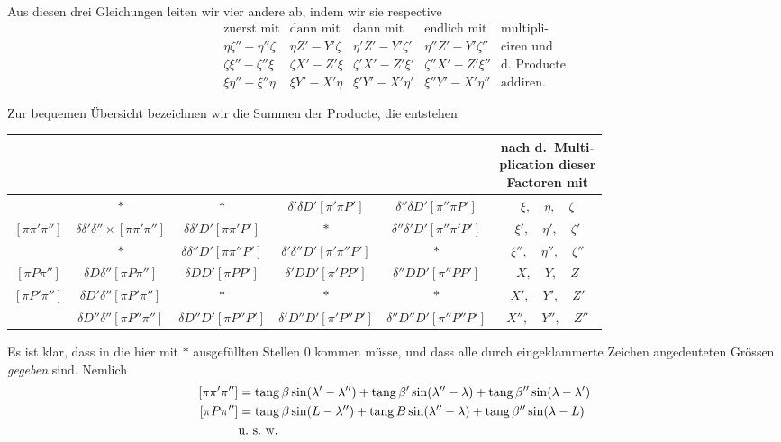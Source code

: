 Aus diesen drei Gleichungen leiten wir vier andere ab, indem wir sie respective
\[
\begin{array}{c|c|c|c|l}
\text{zuerst mit}&\text{dann mit}&\text{dann mit}&\text{endlich mit}&\text{multipli-}\\
\eta\zeta''-\eta''\zeta&\eta Z'-Y'\zeta&\eta'Z'-Y'\zeta'&\eta''Z'-Y'\zeta''&\text{ciren und}\\
\zeta\xi''-\zeta''\xi&\zeta X'-Z'\xi&\zeta'X'-Z'\xi'&\zeta''X'-Z'\xi''&\text{d.\ Producte}\\
\xi\eta''-\xi''\eta&\xi Y'-X'\eta&\xi'Y'-X'\eta'&\xi''Y'-X'\eta''&\text{addiren.}
\end{array}
\]

Zur bequemen Übersicht bezeichnen wir die Summen der Producte, die entstehen
\begin{center}\begingroup\fontsize{9}{11}\selectfont\setlength{\tabcolsep}{.8pt}
\begin{tabular}{c|c|c|c|c|c}
&&&&&\shortstack{nach d.\ Multi-\\plication dieser\\Factoren mit}\\\hline
&$*$&$*$&$\delta'\delta D'[\pi'\pi P']$&$\delta''\delta D'[\pi''\pi P']$&$\xi,\quad\eta,\quad\zeta$\\
$[\pi\pi'\pi'']$&$\delta\delta'\delta''\times[\pi\pi'\pi'']$&$\delta\delta'D'[\pi\pi'P']$&$*$&$\delta''\delta'D'[\pi''\pi'P']$&$\xi',\quad\eta',\quad\zeta'$\\
&$*$&$\delta\delta''D'[\pi\pi''P']$&$\delta'\delta''D'[\pi'\pi''P']$&$*$&$\xi'',\quad\eta'',\quad\zeta''$\\
$[\pi P\pi'']$&$\delta D\delta''[\pi P\pi'']$&$\delta DD'[\pi PP']$&$\delta'DD'[\pi'PP']$&$\delta''DD'[\pi''PP']$&$X,\quad Y,\quad Z$\\
$[\pi P'\pi'']$&$\delta D'\delta''[\pi P'\pi'']$&$*$&$*$&$*$&$X',\quad Y',\quad Z'$\\
&$\delta D''\delta''[\pi P''\pi'']$&$\delta D''D'[\pi P''P']$&$\delta'D''D'[\pi'P''P']$&$\delta''D''D'[\pi''P''P']$&$X'',\quad Y'',\quad Z''$
\end{tabular}\endgroup\end{center}
Es ist klar, dass in die hier mit $*$ ausgefüllten Stellen $0$ kommen müsse, und dass alle durch eingeklammerte Zeichen angedeuteten Grössen \emph{gegeben} sind. Nemlich
\[
\begin{aligned}\relax
[\pi\pi'\pi'']&=\operatorname{tang}\beta\sin(\lambda'-\lambda'')+\operatorname{tang}\beta'\sin(\lambda''-\lambda)+\operatorname{tang}\beta''\sin(\lambda-\lambda')\\\relax
[\pi P\pi'']&=\operatorname{tang}\beta\sin(L-\lambda'')+\operatorname{tang}B\sin(\lambda''-\lambda)+\operatorname{tang}\beta''\sin(\lambda-L)\\
&\text{u.\ s.\ w.}
\end{aligned}
\]

